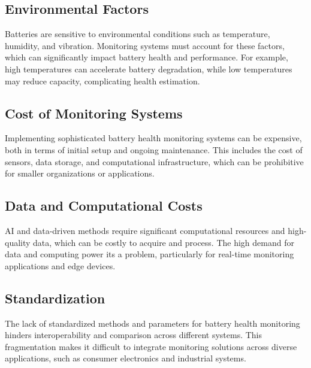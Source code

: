 \subsection{Environmental Factors}
Batteries are sensitive to environmental conditions such as temperature, humidity, and vibration. 
Monitoring systems must account for these factors, which can significantly impact battery health and performance. 
For example, high temperatures can accelerate battery degradation, while low temperatures may reduce capacity, complicating health estimation.

\subsection{Cost of Monitoring Systems}
Implementing sophisticated battery health monitoring systems can be expensive, both in terms of initial setup and ongoing maintenance. 
This includes the cost of sensors, data storage, and computational infrastructure, which can be prohibitive for smaller organizations or applications.

\subsection{Data and Computational Costs}
AI and data-driven methods require significant computational resources and high-quality data, which can be costly to acquire and process. 
The high demand for data and computing power its a problem, particularly for real-time monitoring applications and edge devices.

\subsection{Standardization}
The lack of standardized methods and parameters for battery health monitoring hinders interoperability and comparison across different systems. 
This fragmentation makes it difficult to integrate monitoring solutions across diverse applications, such as consumer electronics and industrial systems.





